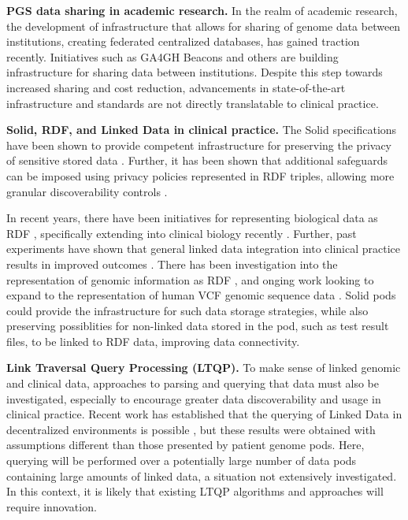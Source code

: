 \documentclass[runningheads]{llncs}
\begin{document}
\textbf{PGS data sharing in academic research.}
In the realm of academic research, the development of infrastructure that allows for sharing of genome data between institutions, creating federated centralized databases, has gained traction recently. 
Initiatives such as GA4GH Beacons \cite{rambla_beacon_2022} and others are building infrastructure for sharing data between institutions. 
Despite this step towards increased sharing and cost reduction, advancements in state-of-the-art infrastructure and standards are not directly translatable to clinical practice. 

\textbf{Solid, RDF, and Linked Data in clinical practice.}
The Solid specifications have been shown to provide competent infrastructure for preserving the privacy of sensitive stored data \cite{esposito_assessing_2022}.
Further, it has been shown that additional safeguards can be imposed using privacy policies represented in RDF triples, allowing more granular discoverability controls \cite{benaribi_sparql-based_2023}. 

In recent years, there have been initiatives for representing biological data as RDF \cite{sib_swiss_institute_of_bioinformatics_rdf_group_members_sib_2024}, specifically extending into clinical biology recently \cite{van_der_horst_bridging_2023}. 
Further, past experiments have shown that general linked data integration into clinical practice results in improved outcomes \cite{farinelli_linked_2015}.
There has been investigation into the representation of genomic information as RDF \cite{prasanna_scalable_2023}, and onging work looking to expand to the representation of human VCF genomic sequence data \cite{van_der_horst_bridging_2023}.
Solid pods could provide the infrastructure for such data storage strategies, while also preserving possiblities for non-linked data stored in the pod, such as test result files, to be linked to RDF data, improving data connectivity. 

\textbf{Link Traversal Query Processing (LTQP).}
To make sense of linked genomic and clinical data, approaches to parsing and querying that data must also be investigated, especially to encourage greater data discoverability and usage in clinical practice.
Recent work has established that the querying of Linked Data in decentralized environments is possible \cite{taelman_evaluation_2023}, but these results were obtained with assumptions different than those presented by patient genome pods.
Here, querying will be performed over a potentially large number of data pods containing large amounts of linked data, a situation not extensively investigated. In this context, it is likely that existing LTQP algorithms and approaches will require innovation. 
\end{document}
